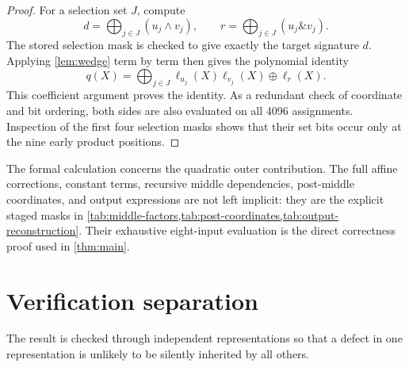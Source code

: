 \documentclass[11pt]{article}
\theoremstyle{definition}
\begin{document}
\begin{proof}
For a selection set \(J\), compute
\[
 d=\bigoplus_{j\in J}(u_j\wedge v_j),
 \qquad
 r=\bigoplus_{j\in J}(u_j\mathbin{\&}v_j).
\]
The stored selection mask is checked to give exactly the target signature \(d\).  Applying
\cref{lem:wedge} term by term then gives the polynomial identity
\[
 q(X)=\bigoplus_{j\in J}\ell_{u_j}(X)\ell_{v_j}(X)\oplus\ell_r(X).
\]
This coefficient argument proves the identity.  As a redundant check of coordinate and bit ordering,
both sides are also evaluated on all 4096 assignments.  Inspection of the first four selection masks
shows that their set bits occur only at the nine early product positions.
\end{proof}

The formal calculation concerns the quadratic outer contribution.  The full affine corrections,
constant terms, recursive middle dependencies, post-middle coordinates, and output expressions are
not left implicit: they are the explicit staged masks in \cref{tab:middle-factors,tab:post-coordinates,tab:output-reconstruction}.
Their exhaustive eight-input evaluation is the direct correctness proof used in
\cref{thm:main}.

\section{Verification separation}
\label{sec:verification}

The result is checked through independent representations so that a defect in one representation is
unlikely to be silently inherited by all others.
\end{document}

